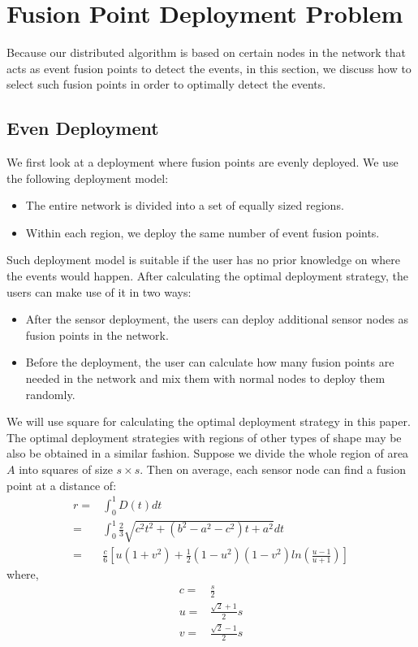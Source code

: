 \section{Fusion Point Deployment Problem}
Because our distributed algorithm is based on certain nodes in the network that acts as event fusion points to detect the events, in this section, we discuss how to select such fusion points in order to optimally detect the events.
\subsection{Even Deployment}
We first look at a deployment where fusion points are evenly deployed. We use the following deployment model:
\begin{itemize}
\item The entire network is divided into a set of equally sized regions.
\item Within each region, we deploy the same number of event fusion points. 
\end{itemize}

Such deployment model is suitable if the user has no prior knowledge on where the events would happen. After calculating the optimal deployment strategy, the users can make use of it in two ways:
\begin{itemize}
\item After the sensor deployment, the users can deploy additional sensor nodes as fusion points in the network.
\item Before the deployment, the user can calculate how many fusion points are needed in the network and mix them with normal nodes to deploy them randomly.
\end{itemize}
We will use square for calculating the optimal deployment strategy in this paper. The optimal deployment strategies with regions of other types of shape may be also be obtained in a similar fashion. Suppose we divide the whole region of area \(A\) into squares of size \(s\times s\). Then on average, each sensor node can find a fusion point at a distance of:
\begin{align}
r=&\int_0^1D(t)dt\nonumber\\
=&\int_0^1\frac{2}{3}\sqrt{c^2t^2+(b^2-a^2-c^2)t+a^2}dt\nonumber\\
=&\frac{c}{6}[u(1+v^2)+\frac{1}{2}(1-u^2)(1-v^2)ln(\frac{u-1}{u+1})]\label{eq:avgdist1}
\end{align}
where,
\begin{align}
c=&\frac{s}{2}\nonumber\\
u=&\frac{\sqrt{2}+1}{2}s\nonumber\\
v=&\frac{\sqrt{2}-1}{2}s\label{eq:avgdist2}
\end{align}

